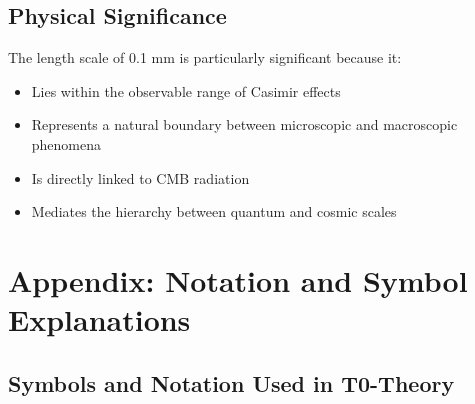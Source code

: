 \documentclass[12pt,a4paper]{article}
\numberwithin{equation}{section}
\begin{document}
	\subsection*{Physical Significance}
	
	The length scale of 0.1 mm is particularly significant because it:
	\begin{itemize}
		\item Lies within the observable range of Casimir effects
		\item Represents a natural boundary between microscopic and macroscopic phenomena
		\item Is directly linked to CMB radiation
		\item Mediates the hierarchy between quantum and cosmic scales
	\end{itemize}
\section*{Appendix: Notation and Symbol Explanations}

\subsection*{Symbols and Notation Used in T0-Theory}
\end{document}

